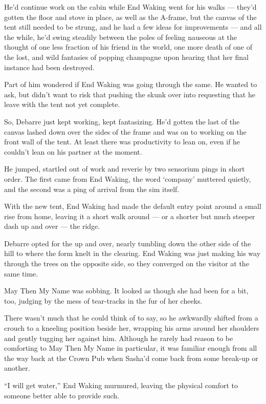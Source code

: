 He'd continue work on the cabin while End Waking went for his walks — they'd gotten the floor and stove in place, as well as the A-frame, but the canvas of the tent still needed to be strung, and he had a few ideas for improvements — and all the while, he'd swing steadily between the poles of feeling nauseous at the thought of one less fraction of his friend in the world, one more death of one of the lost, and wild fantasies of popping champagne upon hearing that her final instance had been destroyed.

Part of him wondered if End Waking was going through the same. He wanted to ask, but didn't want to risk that pushing the skunk over into requesting that he leave with the tent not yet complete.

So, Debarre just kept working, kept fantasizing. He'd gotten the last of the canvas lashed down over the sides of the frame and was on to working on the front wall of the tent. At least there was productivity to lean on, even if he couldn't lean on his partner at the moment.

He jumped, startled out of work and reverie by two sensorium pings in short order. The first came from End Waking, the word `company' muttered quietly, and the second was a ping of arrival from the sim itself.

With the new tent, End Waking had made the default entry point around a small rise from home, leaving it a short walk around — or a shorter but much steeper dash up and over — the ridge.

Debarre opted for the up and over, nearly tumbling down the other side of the hill to where the form knelt in the clearing. End Waking was just making his way through the trees on the opposite side, so they converged on the visitor at the same time.

May Then My Name was sobbing. It looked as though she had been for a bit, too, judging by the mess of tear-tracks in the fur of her cheeks.

There wasn't much that he could think of to say, so he awkwardly shifted from a crouch to a kneeling position beside her, wrapping his arms around her shoulders and gently tugging her against him. Although he rarely had reason to be comforting to May Then My Name in particular, it was familiar enough from all the way back at the Crown Pub when Sasha'd come back from some break-up or another.

``I will get water,'' End Waking murmured, leaving the physical comfort to someone better able to provide such.


